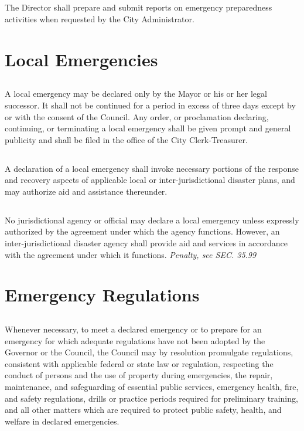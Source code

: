 \subsection{}
The Director shall prepare and submit reports on emergency preparedness activities when requested by the City Administrator.

\section{Local Emergencies}
\subsection{}
A local emergency may be declared only by the Mayor or his or her legal successor.   It shall not be continued for a period in excess of three days except by or with the consent of the Council. Any order, or proclamation declaring, continuing, or terminating a local emergency shall be given prompt and general publicity and shall be filed in the office of the City Clerk-Treasurer.
\subsection{}
A declaration of a local emergency shall invoke necessary portions of the response and recovery aspects of applicable local or inter-jurisdictional disaster plans, and may authorize aid and assistance thereunder.
\subsection{}
No jurisdictional agency or official may declare a local emergency unless expressly authorized by the agreement under which the agency functions. However, an inter-jurisdictional disaster agency shall provide aid and services in accordance with the agreement under which it functions.\newline
\emph{Penalty, see SEC. 35.99}

\section{Emergency Regulations}
\subsection{}
Whenever necessary, to meet a declared emergency or to prepare for an emergency for which adequate regulations have not been adopted by the Governor or the Council, the Council may by resolution promulgate regulations, consistent with applicable federal or state law or regulation, respecting the conduct of persons and the use of property during emergencies, the repair, maintenance, and safeguarding of essential public services, emergency health, fire, and safety regulations, drills or practice periods required for preliminary training, and all other matters which are required to protect public safety, health, and welfare in declared emergencies.

